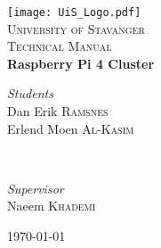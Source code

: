 \begin{titlepage} %
	\newcommand{\HRule}{\rule{\linewidth}{0.5mm}} %
	
	\center %
	
	
	\vfill
	\texttt{[image: UiS\_Logo.pdf]}\\[1cm] %
	\textsc{\LARGE University of Stavanger}\\[1.5cm] %
	
	
	\textsc{\Large Technical Manual}\\[1.5cm] %
	
	
	{\huge\bfseries Raspberry Pi 4 Cluster}\\[3.0cm]
	
	
	\begin{minipage}{0.4\textwidth}
		\begin{flushleft}
			\large
			\textit{Students}\\
			Dan Erik \textsc{Ramsnes}\\
			Erlend Moen \textsc{Al-Kasim}
		\end{flushleft}
	\end{minipage}
	~
	\begin{minipage}{0.4\textwidth}
		\begin{flushright}
			\large
			\textit{Supervisor}\\
			Naeem \textsc{Khademi}\\
			\phantom{1pt}
		\end{flushright}
	\end{minipage}
	
	
	\vfill\vfill\vfill %
	{\large\today} %
	\vfill %
	
\end{titlepage}